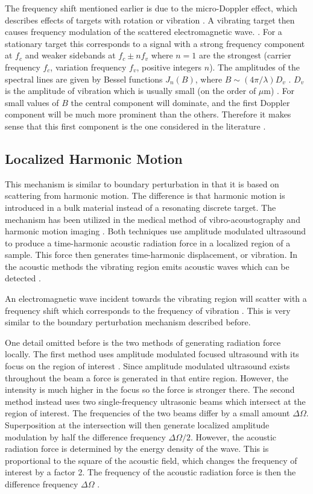 \documentclass[10pt,a4paper]{eitExjobb}
\begin{document}
	The frequency shift mentioned earlier is due to the micro-Doppler effect, which describes effects of targets with rotation or vibration \cite{Buerkle2007}. A vibrating target then causes frequency modulation of the scattered electromagnetic wave. \cite{Chen2006}. For a stationary target this corresponds to a signal with a strong frequency component at $f_c$ and weaker sidebands at $f_c \pm n f_v$ where $n=1$ are the strongest (carrier frequency $f_c$, variation frequency $f_v$, positive integers $n$). The amplitudes of the spectral lines are given by Bessel functions $J_n(B)$, where $B \sim (4\pi/\lambda)D_v$ \cite{Chen2006}. $D_v$ is the amplitude of vibration which is usually small (on the order of $\mu$m) \cite{Buerkle2007}\cite{Top2014}. For small values of $B$ the central component will dominate, and the first Doppler component will be much more prominent than the others. Therefore it makes sense that this first component is the one considered in the literature \cite{Buerkle2007}.
	
	\subsection{Localized Harmonic Motion}
	This mechanism is similar to boundary perturbation in that it is based on scattering from harmonic motion. The difference is that harmonic motion is introduced in a bulk material instead of a resonating discrete target. The mechanism has been utilized in the medical method of vibro-acoustography and harmonic motion imaging \cite{Wang2018}. Both techniques use amplitude modulated ultrasound to produce a time-harmonic acoustic radiation force in a localized region of a sample. This force then generates time-harmonic displacement, or vibration. In the acoustic methods the vibrating region emits acoustic waves which can be detected \cite{Fatemi1998}\cite{Konofagou2003}.
	
	An electromagnetic wave incident towards the vibrating region will scatter with a frequency shift which corresponds to the frequency of vibration \cite{Top2014}. This is very similar to the boundary perturbation mechanism described before.
	
	One detail omitted before is the two methods of generating radiation force locally. The first method uses amplitude modulated focused ultrasound with its focus on the region of interest \cite{Top2016}. Since amplitude modulated ultrasound exists throughout the beam a force is generated in that entire region. However, the intensity is much higher in the focus so the force is stronger there. The second method instead uses two single-frequency ultrasonic beams which intersect at the region of interest. The frequencies of the two beams differ by a small amount $\Delta \Omega$. Superposition at the intersection will then generate localized amplitude modulation by half the difference frequency $\Delta \Omega/2$. However, the acoustic radiation force is determined by the energy density of the wave. This is proportional to the square of the acoustic field, which changes the frequency of interest by a factor 2. The frequency of the acoustic radiation force is then the difference frequency $\Delta \Omega$ \cite{Fatemi1998}.
	
\end{document}
